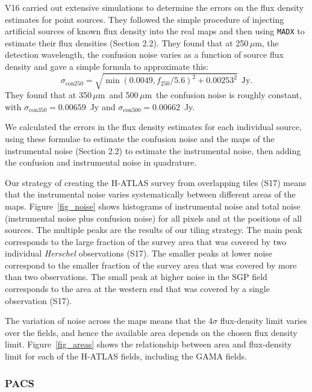 \documentclass[a4paper,fleqn,usenatbib, twocolumn]{aastex61}
\def\mic{\,$\mu $m}
\begin{document}
V16 carried out extensive simulations to determine the
errors on the flux density estimates for point sources.
They followed the simple procedure of injecting artificial
sources of known flux density into the real maps and then
using {\tt MADX} to estimate their flux densities
(Section 2.2).  
They found that at 250\mic, the detection
wavelength, the confusion noise varies as a function
of source flux density and gave a simple formula to approximate this:
\smallskip
\begin{equation}
\sigma_{\mathrm{con}250} = \sqrt{\min(0.0049,f_{250}/5.6)^2 +
  0.00253^2} \ \ \mathrm{Jy}.
\end{equation}
\smallskip
\noindent They found that 
at 350\mic\ and 500\mic\ the confusion noise 
is roughly constant, with $\sigma_{\mathrm{con}350} = 0.00659$~Jy and
$\sigma_{\mathrm{con}500} = 0.00662$~Jy.

We calculated the errors in the flux density estimates for each
individual source, using these formulae to estimate the confusion
noise and the maps of the instrumental noise (Section 2.2) to estimate
the instrumental noise, then adding the confusion and instrumental
noise in quadrature.


Our strategy of creating the H-ATLAS survey from overlapping tiles
(S17) means that the instrumental noise varies systematically between
different areas of the maps.  Figure~\ref{fig_noise} shows histograms
of instrumental noise and total noise (instrumental noise plus
confusion noise) for all pixels and at the positions of all sources.
The multiple peaks are the results of our tiling strategy. The main
peak corresponds to the large fraction of the survey area that was
covered by two individual {\it Herschel} observations (S17). The
smaller peaks at lower noise correspond to the smaller fraction of the
survey area that was covered by more than two observations. The small
peak at higher noise in the SGP field corresponds to the area at the
western end that was covered by a single observation (S17).

The variation of noise across the maps means that the 4$\sigma$
flux-density limit varies over the fields, and hence the available
area depends on the chosen flux density limit. Figure~\ref{fig_areas}
shows the relationship between area and flux-density limit for each of
the H-ATLAS fields, including the GAMA fields.



\subsubsection{PACS}
\end{document}
